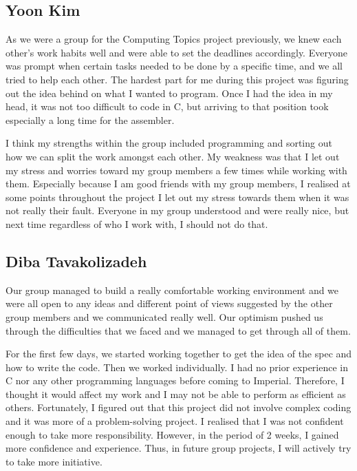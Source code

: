 \documentclass[11pt]{article}
\begin{document}
\subsection{Yoon Kim}

As we were a group for the Computing Topics project previously, we knew each other's work habits well and were able to set the deadlines accordingly. Everyone was prompt when certain tasks needed to be done by a specific time, and we all tried to help each other. The hardest part for me during this project was figuring out the idea behind on what I wanted to program. Once I had the idea in my head, it was not too difficult to code in C, but arriving to that position took especially a long time for the assembler.

I think my strengths within the group included programming and sorting out how we can split the work amongst each other. My weakness was that I let out my stress and worries toward my group members a few times while working with them. Especially because I am good friends with my group members, I realised at some points throughout the project I let out my stress towards them when it was not really their fault. Everyone in my group understood and were really nice, but next time regardless of who I work with, I should not do that.

\subsection{Diba Tavakolizadeh}

Our group managed to build a really comfortable working environment and we were all open to any ideas and different point of views suggested by the other group members and we communicated really well. Our optimism pushed us through the difficulties that we faced and we managed to get through all of them.

For the first few days, we started working together to get the idea of the spec and how to write the code. Then we worked individually. I had no prior experience in C nor any other programming languages before coming to Imperial. Therefore, I thought it would affect my work and I may not be able to perform as efficient as others. Fortunately, I figured out that this project did not involve complex coding and it was more of a problem-solving project. I realised that I was not confident enough to take more responsibility. However, in the period of 2 weeks, I gained more confidence and experience. Thus, in future group projects, I will actively try to take more initiative.
\end{document}
